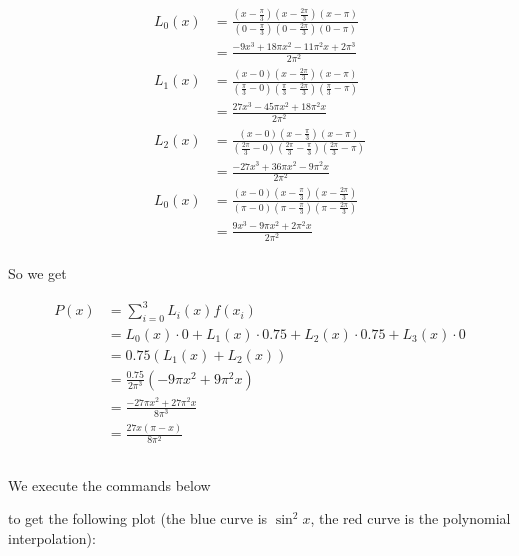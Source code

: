 \documentclass[11pt]{article}
\begin{document}
\renewcommand{\thesubsection}{\thesection.\alph{subsection}}
\section{} %
\subsection{} %
\begin{align*}
	L_0(x)&=\frac{\left(x-\frac{\pi}{3}\right)\left(x-\frac{2\pi}{3}\right)\left(x-\pi\right)}
		{\left(0-\frac{\pi}{3}\right)\left(0-\frac{2\pi}{3}\right)\left(0-\pi\right)}\\
		&=\frac{-9x^3+18\pi x^2-11\pi^2x+2\pi^3}{2\pi^2}\\
	L_1(x)&=\frac{\left(x-0\right)\left(x-\frac{2\pi}{3}\right)\left(x-\pi\right)}
		{\left(\frac{\pi}{3}-0\right)\left(\frac{\pi}{3}-\frac{2\pi}{3}\right)\left(\frac{\pi}{3}-\pi\right)}\\
		&=\frac{27x^3-45\pi x^2+18\pi^2x}{2\pi^2}\\
	L_2(x)&=\frac{\left(x-0\right)\left(x-\frac{\pi}{3}\right)\left(x-\pi\right)}
		{\left(\frac{2\pi}{3}-0\right)\left(\frac{2\pi}{3}-\frac{\pi}{3}\right)\left(\frac{2\pi}{3}-\pi\right)}\\
		&=\frac{-27x^3+36\pi x^2-9\pi^2x}{2\pi^2}\\
	L_0(x)&=\frac{\left(x-0\right)\left(x-\frac{\pi}{3}\right)\left(x-\frac{2\pi}{3}\right)}
		{\left(\pi-0\right)\left(\pi-\frac{\pi}{3}\right)\left(\pi-\frac{2\pi}{3}\right)}\\
		&=\frac{9x^3-9\pi x^2+2\pi^2x}{2\pi^2}\\
\end{align*}

So we get

\begin{align*}
	P(x)&=\sum^3_{i=0} L_i(x)f(x_i)\\
	&=L_0(x)\cdot0+L_1(x)\cdot0.75+L_2(x)\cdot0.75+L_3(x)\cdot0\\
	&=0.75\left(L_1(x)+L_2(x)\right)\\
	&=\frac{0.75}{2\pi^3}\left(-9\pi x^2+9\pi^2x\right)\\
	&=\frac{-27\pi x^2+27\pi^2x}{8\pi^3}\\
	&=\frac{27x(\pi-x)}{8\pi^2}
\end{align*}


\subsection{} %
We execute the commands below

to get the following plot (the blue curve is $\sin^2x$, the red curve is the
polynomial interpolation):
\end{document}
